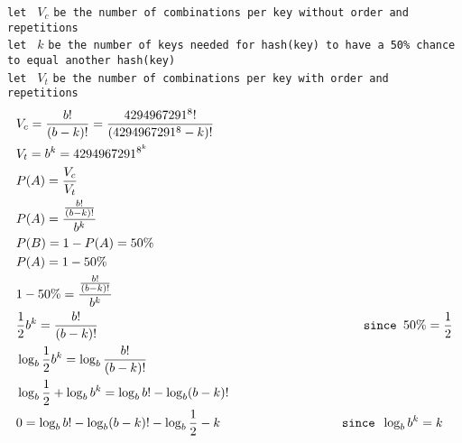\documentclass[fleqn, a4paper,12pt]{article}
\begin{document}
\texttt{let } $V_c$ \texttt{be the number of combinations per key without order and repetitions} \\
\texttt{let } $k$ \texttt{be the number of keys needed for hash(key) to have a 50\% chance to equal another hash(key)} \\
\texttt{let } $V_t$ \texttt{be the number of combinations per key with order and repetitions} \\

\[
\begin{aligned}
&V_c = \frac{b!}{(b-k)!} = \frac{4294967291^8!}{(4294967291^8-k)!} \\
&V_t = b^k = 4294967291^{8^k} \\
&P(A) = \frac{V_c}{V_t} \\
&P(A) = \frac{\frac{b!}{(b-k)!}}{b^k} \\
&P(B) = 1- P(A) = 50\%\\
&P(A) = 1 - 50\%\\
&1 - 50\% = \frac{\frac{b!}{(b-k)!}}{b^k} \\
&\frac{1}{2}b^k =  \frac{b!}{(b-k)!} \hspace{7.2cm} \texttt{ since }50\% = \frac{1}{2} \\
&\log_b\frac{1}{2}b^k = \log_b\frac{b!}{(b-k)!} \\
&\log_b\frac{1}{2} + \log_bb^k = \log_bb! - \log_b(b-k)! \\
&0 = \log_bb! - \log_b(b-k)! - \log_b\frac{1}{2} - k \hspace{3.2cm} \texttt{ since }\log_bb^k = k\\
\end{aligned}
\]
\thispagestyle{empty} %
\end{document}
